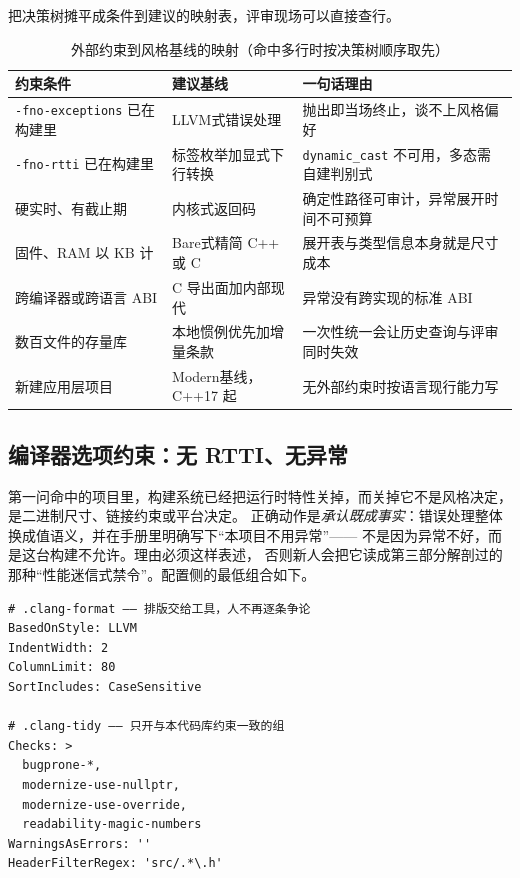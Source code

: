 \documentclass[12pt,a4paper,fontset=fandol]{ctexbook}
\newcommand{\cpp}[1]{C++#1}
\newcommand{\Tp}[1]{\texttt{#1}}
\newcommand{\Lang}[1]{\textsf{#1}}
\newcommand{\CL}{\Lang{C}}
\newcommand{\CPP}{\Lang{C++}}
\newcommand{\DomLlvm}{\Lang{LLVM}}
\newcommand{\DomMod}{\Lang{Modern}}
\newcommand{\DomBare}{\Lang{Bare}}
\begin{document}
把决策树摊平成条件到建议的映射表，评审现场可以直接查行。

\begin{table}[htbp]
  \centering
  \small
  \begin{tabularx}{0.83\textwidth}{@{}>{\raggedright\arraybackslash}p{}
    >{\raggedright\arraybackslash}p{} X@{}}
    \toprule
    约束条件 & 建议基线 & 一句话理由 \\
    \midrule
    \Tp{-fno-exceptions} 已在构建里 & \DomLlvm 式错误处理 & 抛出即当场终止，谈不上风格偏好 \\
    \Tp{-fno-rtti} 已在构建里 & 标签枚举加显式下行转换 & \Tp{dynamic\_cast} 不可用，多态需自建判别式 \\
    硬实时、有截止期 & 内核式返回码 & 确定性路径可审计，异常展开时间不可预算 \\
    固件、RAM 以 KB 计 & \DomBare 式精简 \CPP{} 或 \CL & 展开表与类型信息本身就是尺寸成本 \\
    跨编译器或跨语言 ABI & \Lang{C} 导出面加内部现代 & 异常没有跨实现的标准 ABI \\
    数百文件的存量库 & 本地惯例优先加增量条款 & 一次性统一会让历史查询与评审同时失效 \\
    新建应用层项目 & \DomMod 基线，\cpp{17} 起 & 无外部约束时按语言现行能力写 \\
    \bottomrule
  \end{tabularx}
  \caption{外部约束到风格基线的映射（命中多行时按决策树顺序取先）}\label{tab:ch14-baseline}
\end{table}

\subsection{编译器选项约束：无 RTTI、无异常}
\label{sec:ch14-noexcept-target}

第一问命中的项目里，构建系统已经把运行时特性关掉，而关掉它不是风格决定，是二进制尺寸、链接约束或平台决定。
正确动作是\emph{承认既成事实}：错误处理整体换成值语义，并在手册里明确写下``本项目不用异常''——
不是因为异常不好，而是这台构建不允许。理由必须这样表述，
否则新人会把它读成第三部分解剖过的那种``性能迷信式禁令''。配置侧的最低组合如下。

\begin{lstlisting}[style=yamlstyle]
# .clang-format —— 排版交给工具，人不再逐条争论
BasedOnStyle: LLVM
IndentWidth: 2
ColumnLimit: 80
SortIncludes: CaseSensitive

# .clang-tidy —— 只开与本代码库约束一致的组
Checks: >
  bugprone-*,
  modernize-use-nullptr,
  modernize-use-override,
  readability-magic-numbers
WarningsAsErrors: ''
HeaderFilterRegex: 'src/.*\.h'
\end{lstlisting}
\end{document}
